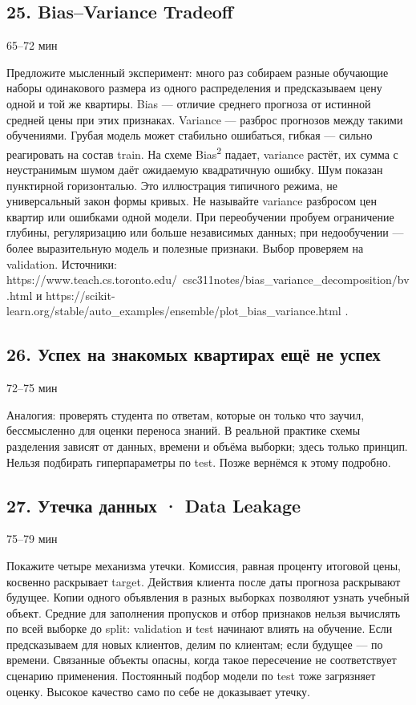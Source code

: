\documentclass[11pt,a4paper]{article}
\newcommand{\timing}[1]{\hfill{\small\color{blue}#1}}
\begin{document}
\subsection{25. Bias–Variance Tradeoff}
\timing{65–72 мин}

Предложите мысленный эксперимент: много раз собираем разные обучающие наборы одинакового размера из одного распределения и предсказываем цену одной и той же квартиры. Bias — отличие среднего прогноза от истинной средней цены при этих признаках. Variance — разброс прогнозов между такими обучениями. Грубая модель может стабильно ошибаться, гибкая — сильно реагировать на состав train. На схеме Bias\textsuperscript{2} падает, variance растёт, их сумма с неустранимым шумом даёт ожидаемую квадратичную ошибку. Шум показан пунктирной горизонталью. Это иллюстрация типичного режима, не универсальный закон формы кривых. Не называйте variance разбросом цен квартир или ошибками одной модели. При переобучении пробуем ограничение глубины, регуляризацию или больше независимых данных; при недообучении — более выразительную модель и полезные признаки. Выбор проверяем на validation. Источники: https://www.teach.cs.toronto.edu/~csc311notes/bias\_variance\_decomposition/bv.html и https://scikit-learn.org/stable/auto\_examples/ensemble/plot\_bias\_variance.html .

\subsection{26. Успех на знакомых квартирах ещё не успех}
\timing{72–75 мин}

Аналогия: проверять студента по ответам, которые он только что заучил, бессмысленно для оценки переноса знаний. В реальной практике схемы разделения зависят от данных, времени и объёма выборки; здесь только принцип. Нельзя подбирать гиперпараметры по test. Позже вернёмся к этому подробно.

\subsection{27. Утечка данных · Data Leakage}
\timing{75–79 мин}

Покажите четыре механизма утечки. Комиссия, равная проценту итоговой цены, косвенно раскрывает target. Действия клиента после даты прогноза раскрывают будущее. Копии одного объявления в разных выборках позволяют узнать учебный объект. Средние для заполнения пропусков и отбор признаков нельзя вычислять по всей выборке до split: validation и test начинают влиять на обучение. Если предсказываем для новых клиентов, делим по клиентам; если будущее — по времени. Связанные объекты опасны, когда такое пересечение не соответствует сценарию применения. Постоянный подбор модели по test тоже загрязняет оценку. Высокое качество само по себе не доказывает утечку.
\end{document}
